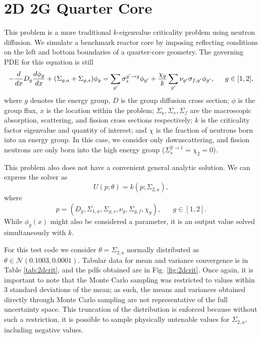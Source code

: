 \section{2D 2G Quarter Core}
This problem is a more traditional $k$-eigenvalue criticality problem using neutron diffusion.  We simulate a benchmark reactor core by imposing reflecting conditions on the left and bottom boundaries of a quarter-core geometry.  The governing PDE for this equation is still
\begin{equation}
-\frac{d }{d x}D_g\frac{d \phi_g}{d x}+(\Sigma_{g,a}+\Sigma_{g,s})\phi_g = \sum_{g'}\sigma_{s}^{g'\to g}\phi_{g'} + \frac{\chi_{g}}{k}\sum_{g'}\nu_{g'}\sigma_{f,g'}\phi_{g'},\hspace{15pt} g\in[1,2],
\end{equation}
where $g$ denotes the energy group, $D$ is the group diffusion cross section; $\phi$ is the group flux, $x$ is the location within the problem; $\Sigma_a,\Sigma_s,\Sigma_f$ are the macroscopic absorption, scattering, and fission cross sections respectively; $k$ is the criticality factor eigenvalue and quantity of interest; and $\chi$ is the fraction of neutrons born into an energy group.  In this case, we consider only downscattering, and fission neutrons are only born into the high energy group ($\Sigma_s^{2\to1}=\chi_2=0$).

This problem also does not have a convenient general analytic solution.  We can express the solver as
\begin{equation}
U(p;\theta) = k(p;\Sigma_{2,a}),
\end{equation}
where
\begin{equation}
p=(D_g,\Sigma_{1,a},\Sigma_{g,s},\nu_g,\Sigma_{g,f},\chi_g),\hspace{20pt}g\in[1,2].
\end{equation}
While $\phi_g(x)$ might also be considered a parameter, it is an output value solved simultaneously with $k$.

For this test code we consider $\theta=\Sigma_{2,a}$ normally distributed as $\theta\in\mathcal{N}(0.1003,0.0001)$. Tabular data for mean and variance convergence is in Table \ref{tab:2dcrit}, and the pdfs obtained are in Fig. \ref{fig:2dcrit}.  Once again, it is important to note that the Monte Carlo sampling was restricted to values within 3 standard deviations of the mean; as such, the means and variances obtained directly through Monte Carlo sampling are not representative of the full uncertainty space.  This truncation of the distribution is enforced because without such a restriction, it is possible to sample physically untenable values for $\Sigma_{2,a}$, including negative values.

